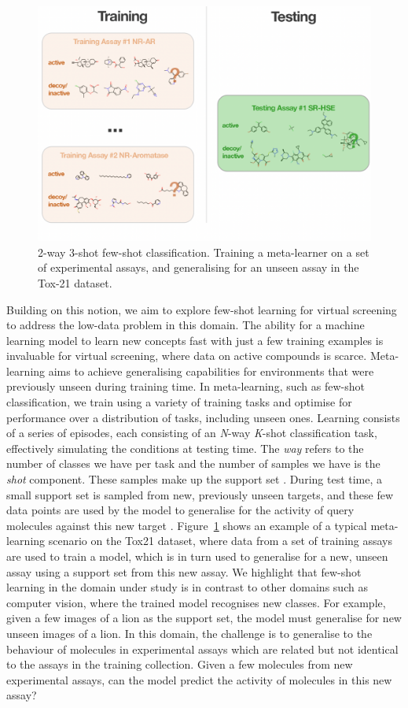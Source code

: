 \begin{figure}
	\centering
	\includegraphics[width=0.8\linewidth]{img/tox21-metalearning.png}
	\caption{2-way 3-shot few-shot classification. Training a meta-learner on a set of experimental assays, and generalising for an unseen assay in the Tox-21 dataset.}
	\label{fig:tox21metalearning}
\end{figure}

Building on this notion, we aim to explore few-shot learning for virtual screening to address the low-data problem in this domain. The ability for a machine learning model to learn new concepts fast with just a few training examples is invaluable for virtual screening, where data on active compounds is scarce. Meta-learning aims to achieve generalising capabilities for environments that were previously unseen during training time. In meta-learning, such as few-shot classification, we train using a variety of training tasks and optimise for performance over a distribution of tasks, including unseen ones. Learning consists of a series of episodes, each consisting of an \textit{N}-way \textit{K}-shot classification task, effectively simulating the conditions at testing time. The \textit{way} refers to the number of classes we have per task and the number of samples we have is the \textit{shot} component. These samples make up the support set \cite{snell2017prototypical}. During test time, a small support set is sampled from new, previously unseen targets, and these few data points are used by the model to generalise for the activity of query molecules against this new target \cite{vinyals2016matching}. Figure~\ref{fig:tox21metalearning} shows an example of a typical meta-learning scenario on the Tox21 dataset, where data from a set of training assays are used to train a model, which is in turn used to generalise for a new, unseen assay using a support set from this new assay. We highlight that few-shot learning in the domain under study is in contrast to other domains such as computer vision, where the trained model recognises new classes. For example, given a few images of a lion as the support set, the model must generalise for new unseen images of a lion. In this domain, the challenge is to generalise to the behaviour of molecules in experimental assays which are related but not identical to the assays in the training collection. Given a few molecules from new experimental assays, can the model predict the activity of molecules in this new assay?


